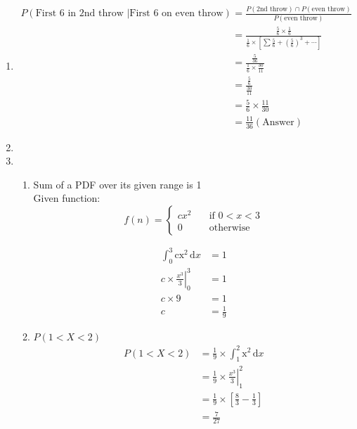\documentclass[a4paper, 12pt]{article}
\begin{document}
\begin{enumerate}
	\item 
	\begin{align*}
		P \left(\text{First 6 in 2nd throw }\right| 
		\left.\text{First 6 on even throw}\right)
		&= \frac{P\left(\text{2nd throw}\right)\cap
		P\left(\text{even throw}\right)}{P\left(
		\text{even throw}\right)}\\
		&= \frac{\frac{5}{6}\times\frac{1}{6}}
		{\frac{1}{6}\times\left[\sum \frac{5}{6}
		+ \left(\frac{5}{6}\right)^3 + \cdots\right]}\\
		&= \frac{\frac{5}{36}}{\frac{1}{6}\times
		\frac{30}{11}}\\
		&= \frac{\frac{5}{6}}{\frac{30}{11}}\\
		&= \frac{5}{6} \times \frac{11}{30}\\
		&= \frac{11}{36} \left(\text{Answer}\right)
	\end{align*}
	
	\item 
	
	\item 
	
	\begin{enumerate}
		\item
		Sum of a PDF over its given range is 1\\
		Given function:
		\[ f(n) = 
			\begin{cases}
				cx^2 & \quad \text{if } 0 < x < 3 \\
				0 & \quad \text{otherwise}
			\end{cases}
		\]
	
		\begin{align*}
			\int_{0}^{3} \mathrm{cx^2}\,\mathrm{d}x &= 1\\
			c\times\left.\frac{x^3}{3}\right|_{0}^{3} &= 1\\
			c\times 9 &= 1\\
			c &= \frac{1}{9}
		\end{align*}
	
		\item $P(1<X<2)$
		\begin{align*}
			P(1<X<2) &= \frac{1}{9} \times 
			\int_{1}^{2} \mathrm{x^2}\,\mathrm{d}x\\
			&= \frac{1}{9} \times \left.\frac{x^3}{3}
			\right|_{1}^{2}\\
			&= \frac{1}{9} \times \left[ \frac{8}{3}
			- \frac{1}{3}\right]\\
			&= \frac{7}{27}
		\end{align*}
	\end{enumerate}		
	

\end{enumerate}
\end{document}
